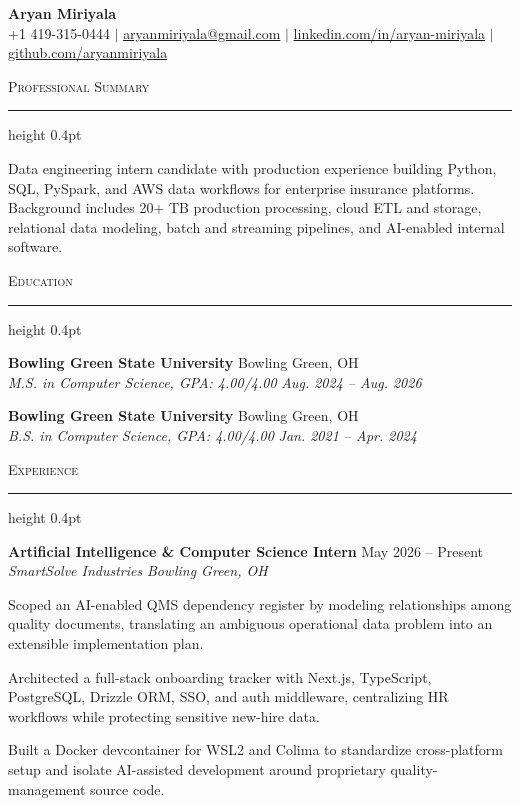 \documentclass[letterpaper,11pt]{article}
\newcommand{\resumesection}[1]{%
  \par\vspace{2pt}%
  {\large\scshape #1}\par\vspace{2pt}%
  \hrule height 0.4pt\vspace{2pt}%
}
\newcommand{\resumeSubheading}[4]{
  \textbf{#1} \hfill #2\\
  \textit{#3} \hfill \textit{#4}
}
\begin{document}
\begin{center}
  {\LARGE \textbf{Aryan Miriyala}}\\[-1pt]
  \small
  +1 419-315-0444 $|$
  \href{mailto:aryanmiriyala@gmail.com}{aryanmiriyala@gmail.com} $|$
  \href{https://www.linkedin.com/in/aryan-miriyala-7788a21b6/}{linkedin.com/in/aryan-miriyala} $|$
  \href{https://github.com/aryanmiriyala}{github.com/aryanmiriyala}
\end{center}\vspace{-10pt}

\resumesection{Professional Summary}
Data engineering intern candidate with production experience building Python, SQL, PySpark, and AWS data workflows for enterprise insurance platforms. Background includes 20+ TB production processing, cloud ETL and storage, relational data modeling, batch and streaming pipelines, and AI-enabled internal software.

\resumesection{Education}
\resumeSubheading
{Bowling Green State University}{Bowling Green, OH}
{M.S. in Computer Science, GPA: 4.00/4.00}{Aug. 2024 -- Aug. 2026}

\resumeSubheading
{Bowling Green State University}{Bowling Green, OH}
{B.S. in Computer Science, GPA: 4.00/4.00}{Jan. 2021 -- Apr. 2024}

\resumesection{Experience}
\resumeSubheading
{Artificial Intelligence \& Computer Science Intern}{May 2026 -- Present}
{SmartSolve Industries}{Bowling Green, OH}
\begin{tightitemize}
  \item Scoped an AI-enabled QMS dependency register by modeling relationships among quality documents, translating an ambiguous operational data problem into an extensible implementation plan.
  \item Architected a full-stack onboarding tracker with Next.js, TypeScript, PostgreSQL, Drizzle ORM, SSO, and auth middleware, centralizing HR workflows while protecting sensitive new-hire data.
  \item Built a Docker devcontainer for WSL2 and Colima to standardize cross-platform setup and isolate AI-assisted development around proprietary quality-management source code.
\end{tightitemize}
\end{document}
